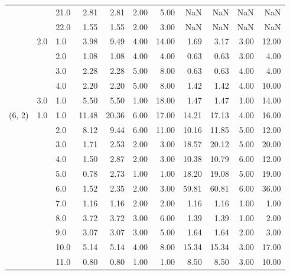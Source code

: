 \begin{tabular}{lllrrrrrrrr}
       &     & 21.0 &       2.81 &      2.81 &  2.00 &   5.00 &        NaN &       NaN &  NaN &    NaN \\
       &     & 22.0 &       1.55 &      1.55 &  2.00 &   3.00 &        NaN &       NaN &  NaN &    NaN \\
       & 2.0 & 1.0  &       3.98 &      9.49 &  4.00 &  14.00 &       1.69 &      3.17 & 3.00 &  12.00 \\
       &     & 2.0  &       1.08 &      1.08 &  4.00 &   4.00 &       0.63 &      0.63 & 3.00 &   4.00 \\
       &     & 3.0  &       2.28 &      2.28 &  5.00 &   8.00 &       0.63 &      0.63 & 4.00 &   4.00 \\
       &     & 4.0  &       2.20 &      2.20 &  5.00 &   8.00 &       1.42 &      1.42 & 4.00 &  10.00 \\
       & 3.0 & 1.0  &       5.50 &      5.50 &  1.00 &  18.00 &       1.47 &      1.47 & 1.00 &  14.00 \\
(6, 2) & 1.0 & 1.0  &      11.48 &     20.36 &  6.00 &  17.00 &      14.21 &     17.13 & 4.00 &  16.00 \\
       &     & 2.0  &       8.12 &      9.44 &  6.00 &  11.00 &      10.16 &     11.85 & 5.00 &  12.00 \\
       &     & 3.0  &       1.71 &      2.53 &  2.00 &   3.00 &      18.57 &     20.12 & 5.00 &  20.00 \\
       &     & 4.0  &       1.50 &      2.87 &  2.00 &   3.00 &      10.38 &     10.79 & 6.00 &  12.00 \\
       &     & 5.0  &       0.78 &      2.73 &  1.00 &   1.00 &      18.20 &     19.08 & 5.00 &  19.00 \\
       &     & 6.0  &       1.52 &      2.35 &  2.00 &   3.00 &      59.81 &     60.81 & 6.00 &  36.00 \\
       &     & 7.0  &       1.16 &      1.16 &  2.00 &   2.00 &       1.16 &      1.16 & 1.00 &   1.00 \\
       &     & 8.0  &       3.72 &      3.72 &  3.00 &   6.00 &       1.39 &      1.39 & 1.00 &   2.00 \\
       &     & 9.0  &       3.07 &      3.07 &  3.00 &   5.00 &       1.64 &      1.64 & 2.00 &   3.00 \\
       &     & 10.0 &       5.14 &      5.14 &  4.00 &   8.00 &      15.34 &     15.34 & 3.00 &  17.00 \\
       &     & 11.0 &       0.80 &      0.80 &  1.00 &   1.00 &       8.50 &      8.50 & 3.00 &  10.00 \\

\end{tabular}

